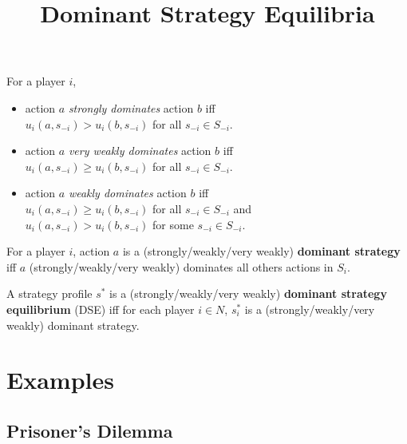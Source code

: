 
\usepackage{diagbox}
\usepackage{tikz}
\usetikzlibrary{arrows.meta}

\title{Dominant Strategy Equilibria}



\maketitle
\initMinimal{}

\begin{definition}
For a player $i$,
\begin{itemize}
\item action $a$ \emph{strongly dominates} action $b$ iff
\\ $u_i(a, s_{-i}) > u_i(b, s_{-i})$ for all $s_{-i} \in S_{-i}$.
\item action $a$ \emph{very weakly dominates} action $b$ iff
\\ $u_i(a, s_{-i}) \ge u_i(b, s_{-i})$ for all $s_{-i} \in S_{-i}$.
\item action $a$ \emph{weakly dominates} action $b$ iff
\\ $u_i(a, s_{-i}) \ge u_i(b, s_{-i})$ for all $s_{-i} \in S_{-i}$ and
\\ $u_i(a, s_{-i}) > u_i(b, s_{-i})$ for some $s_{-i} \in S_{-i}$.
\end{itemize}
\end{definition}

\begin{definition}
For a player $i$, action $a$ is a (strongly/weakly/very weakly) \textbf{dominant strategy} iff
$a$ (strongly/weakly/very weakly) dominates all others actions in $S_i$.
\end{definition}

\begin{definition}
A strategy profile $s^*$ is a (strongly/weakly/very weakly) \textbf{dominant strategy equilibrium}
(DSE) iff for each player $i \in N$, $s^*_i$ is a (strongly/weakly/very weakly) dominant strategy.
\end{definition}

\section{Examples}

\subsection{Prisoner's Dilemma}

